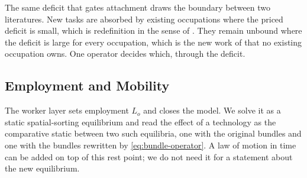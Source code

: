 \documentclass[12pt, a4paper]{article}
\begin{document}
The same deficit that gates attachment draws the boundary between two
literatures. New tasks are absorbed by existing occupations where the
priced deficit is small, which is redefinition in the sense of
\textcite{brynjolfsson2018mlworkforce}. They remain unbound where the
deficit is large for every occupation, which is the new work of
\textcite{acemoglu2019automation} that no existing occupation owns. One
operator decides which, through the deficit.

\subsection{Employment and Mobility}
\label{sec:equilibrium}

The worker layer sets employment $L_o$ and closes the model. We solve it
as a static spatial-sorting equilibrium and read the effect of a
technology as the comparative static between two such equilibria, one
with the original bundles and one with the bundles rewritten by
\eqref{eq:bundle-operator}. A law of motion in time can be added on top
of this rest point; we do not need it for a statement about the new
equilibrium.
\end{document}
